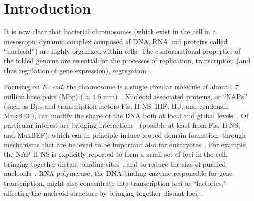 \documentclass[a4paper,12pt,pre,superscriptaddress]{revtex4}
\begin{document}
\maketitle




\section{Introduction} 

%

It is now clear that bacterial chromosomes (which exist in the cell in
a mesoscopic dynamic complex composed of DNA, RNA and proteins called
``nucleoid'') are highly organized within cells. The conformational
properties of the folded genome are essential for the processes of
replication, transcription (and thus regulation of gene expression),
segregation~\cite{Benza2012,Dillon2010,Muskhelishvili2010}.


Focusing on \emph{E.~coli}, the chromosome is a single circular
molecule of about $4.7$ million base pairs (Mbp) ($\approx1.5$
mm)~\cite{Trun1998,Stavans2006}. Nucleoid associated proteins, or
``NAPs'' (such as Dps and transcription factors Fis, H-NS, IHF, HU,
and condensin MukBEF), can modify the shape of the DNA both at local
and global levels~\cite{Dillon2010,LNW+06,Ohniwa2011}.
%
Of particular interest are bridging interactions~\cite{Wiggins2009}
(possible at least from Fis, H-NS, and MukBEF), which can in principle
induce looped domain formation, through mechanisms that are believed
to be important also for eukaryotes~\cite{Brackley2013,Barbieri2013b}.
For example, the NAP H-NS is explicitly reported to form a small set
of foci in the cell, bringing together distant binding
sites~\cite{Wang2011a}, 
and to reduce the size of purified
nucleoids~\cite{Thacker2013}.
RNA polymerase, the DNA-binding enzyme responsible for gene
transcription, might also concentrate into transcription foci or
``factories,'' affecting the nucleoid structure by bringing together
distant loci~\cite{JC06,GHH+05}.
\end{document}
